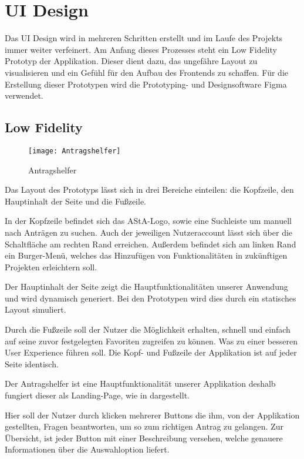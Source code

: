 \chapter{UI Design}\label{ch:ui-design}
Das UI Design wird in mehreren Schritten erstellt und im Laufe des Projekts immer weiter
verfeinert. Am Anfang dieses Prozesses steht ein Low Fidelity Prototyp der Applikation.
Dieser dient dazu, das ungefähre Layout zu visualisieren und ein Gefühl für den Aufbau
des Frontends zu schaffen. %
Für die Erstellung dieser Prototypen wird die Prototyping- und
Designsoftware Figma verwendet.

\section{Low Fidelity}\label{Low Fidelity}
\begin{figure}[h]
  \centering
    \texttt{[image: Antragshelfer]}
    \caption{Antragshelfer}\label{Antragshelfer}
\end{figure}
Das Layout des Prototyps lässt sich in drei Bereiche einteilen:
die Kopfzeile, den Hauptinhalt der Seite und die Fußzeile.

In der Kopfzeile befindet sich das \ac{AStA}-Logo, sowie eine Suchleiste um manuell nach
Anträgen zu suchen.
Auch der jeweiligen Nutzeraccount lässt sich über die Schaltfläche
am rechten Rand erreichen.
Außerdem befindet sich am linken Rand ein Burger-Menü,
welches das Hinzufügen von Funktionalitäten in zukünftigen Projekten erleichtern soll.

Der Hauptinhalt der Seite zeigt die Hauptfunktionalitäten unserer Anwendung und wird 
dynamisch generiert. Bei den Prototypen wird dies
durch ein statisches Layout simuliert.

Durch die Fußzeile soll der Nutzer die Möglichkeit erhalten, schnell und einfach auf
seine zuvor festgelegten Favoriten zugreifen zu können.
Was zu einer besseren User Experience führen soll.
Die Kopf- und Fußzeile der Applikation ist auf jeder Seite identisch.

Der Antragshelfer ist eine Hauptfunktionalität unserer Applikation deshalb fungiert
dieser als Landing-Page, wie in  dargestellt.

Hier soll der Nutzer durch klicken mehrerer Buttons die
ihm, von der Applikation gestellten, Fragen beantworten, um so zum richtigen Antrag zu
gelangen. %
Zur Übersicht, ist jeder Button mit einer Beschreibung versehen, welche genauere Informationen über die Auswahloption liefert.

